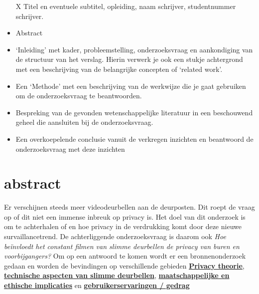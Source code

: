 \documentclass[nonacm, sigconf]{acmart}
\begin{document}
    \maketitle

    \begin{editorsonlyBox}
        \begin{itemize}
            \item[X] Titel en eventuele subtitel, opleiding, naam schrijver, studentnummer schrijver.
            \item Abstract
            \item ‘Inleiding' met kader, probleemstelling, onderzoeksvraag en aankondiging van de structuur van het verslag. Hierin verwerk je ook een stukje achtergrond met een beschrijving van de belangrijke concepten of ‘related work'.
            \item Een ‘Methode' met een beschrijving van de werkwijze die je gaat gebruiken om de onderzoeksvraag te beantwoorden.
            \item Bespreking van de gevonden wetenschappelijke literatuur in een beschouwend geheel die aansluiten bij de onderzoeksvraag.
            \item Een overkoepelende conclusie vanuit de verkregen inzichten en beantwoord de onderzoeksvraag met deze inzichten
        \end{itemize}
    \end{editorsonlyBox}


    \section{abstract}
    Er verschijnen steeds meer videodeurbellen aan de deurposten.
    Dit roept de vraag op of dit niet een immense inbreuk op privacy is.
    Het doel van dit onderzoek is om te achterhalen of en hoe privacy in de verdrukking komt door deze nieuwe survaillancetrend.
    De achterliggende onderzoeksvraag is daarom ook \textit{Hoe beïnvloedt het constant filmen van slimme deurbellen de privacy van buren en voorbijgangers?}
    Om op een antwoord te komen wordt er een bronnenonderzoek gedaan en worden de bevindingen op verschillende gebieden \hyperref[subsec:privacy-theorie]{\textbf{Privacy theorie}}, \hyperref[subsec:technische-aspecten-van-slimme-deurbellen]{\textbf{technische aspecten van slimme deurbellen}}, \hyperref[subsec:maatschappelijke-en-ethische-implicaties]{\textbf{maatschappelijke en ethische implicaties}} en \hyperref[subsec:gebruikerservaring-/-gedrag2]{\textbf{gebruikerservaringen / gedrag}}
\end{document}
